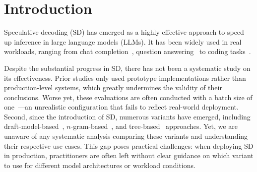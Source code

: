 \section{Introduction}
Speculative decoding (SD) has emerged as a highly effective approach to speed up inference in large language models (LLMs).
It has been widely used in real workloads, ranging from chat completion~\cite{chatgpt}, question answering~\cite{cobbe2021gsm8k, rein2023gpqagraduatelevelgoogleproofqa} to coding tasks~\cite{jimenezswe}. 

Despite the substantial progress in SD, there has not been a systematic study on its effectiveness.
Prior studies only used prototype implementations rather than production-level systems, which greatly undermines the validity of their conclusions. 
Worse yet, these evaluations are often conducted with a batch size of one~\cite{xia-etal-2024-unlocking, cai2024medusa, leviathan2023fast, li2024eagle, li2024eagle2fasterinferencelanguage, li2025eagle3}—an unrealistic configuration that fails to reflect real-world deployment.
Second, since the introduction of SD, numerous variants have emerged, including draft-model-based~\cite{miao2023specinfer, liu2023online, zhou2023distillspec, cascade-inference, chen2024sequoia}, $n$-gram-based~\cite{saxena2023prompt, somasundaram2024pld+}, and tree-based~\cite{cai2024medusa, li2024eagle, lin2024bita, fu2024break, li2024eagle2fasterinferencelanguage, li2025eagle3} approaches. Yet, we are unaware of any systematic analysis comparing these variants and understanding their respective use cases. This gap poses practical challenges: when deploying SD in production, practitioners are often left without clear guidance on which variant to use for different model architectures or workload conditions.

